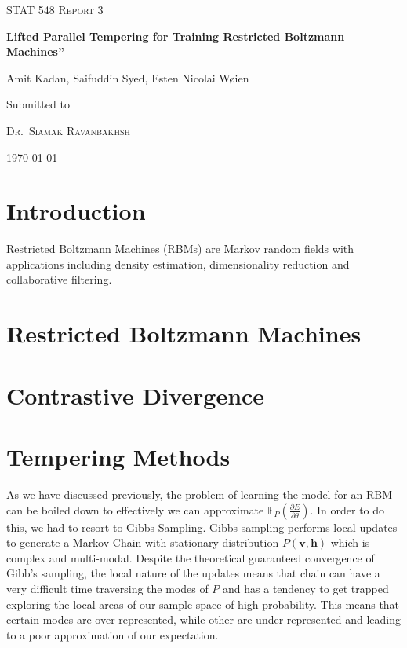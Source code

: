 \documentclass[12pt]{article}
\newcommand{\E}{{\mathbb{E}}}
\begin{document}
\begin{titlepage}
	\centering
	
	{\scshape \Large STAT 548 Report 3
\par}
	\vspace{1cm}
	{\huge\bfseries Lifted Parallel Tempering for Training Restricted Boltzmann Machines''
\par}
	\vspace{0.5cm}
	{\Large  Amit Kadan, Saifuddin Syed, Esten Nicolai W{\o}ien
\par}

	\vfill
	Submitted to\par
	{\scshape Dr.~Siamak Ravanbakhsh}\\
		{ \today\par}



\end{titlepage}

\tableofcontents
\newpage

\section{Introduction}
Restricted Boltzmann Machines (RBMs) are Markov random fields with applications including density estimation, 
dimensionality reduction and collaborative filtering.

\section{Restricted Boltzmann Machines}


\section{Contrastive Divergence}

\section{Tempering Methods}
As we have discussed previously, the problem of learning the model for an RBM can be boiled down to effectively we can approximate $\E_P\left(\frac{\partial E}{\partial \theta}\right)$. In order to do this, we had to resort to Gibbs Sampling. 
Gibbs sampling performs local updates to generate a Markov Chain with stationary distribution $P(\textbf{v},\textbf{h})$ which is complex and multi-modal. Despite the theoretical guaranteed convergence of Gibb's sampling, the local nature of the updates means that chain can have a very difficult time traversing the modes of $P$ and  has a tendency to get trapped exploring the local areas of our sample space of high probability. This means that certain modes are over-represented, while other are under-represented and leading to a poor approximation of our expectation.
\end{document}
